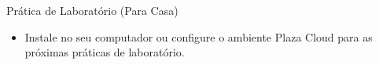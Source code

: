 
\begin{frame}[fragile,t]{Prática de Laboratório (Para Casa)}
  \begin{itemize}
      \item Instale no seu computador ou configure o ambiente Plaza Cloud para as 
      próximas práticas de laboratório.
  \end{itemize}
\end{frame}